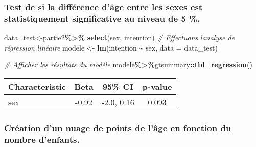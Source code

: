 \documentclass[
]{article}
\newenvironment{Shaded}{\begin{snugshade}}{\end{snugshade}}
\newcommand{\AttributeTok}[1]{\textcolor[rgb]{0.13,0.29,0.53}{#1}}
\newcommand{\CommentTok}[1]{\textcolor[rgb]{0.56,0.35,0.01}{\textit{#1}}}
\newcommand{\FunctionTok}[1]{\textcolor[rgb]{0.13,0.29,0.53}{\textbf{#1}}}
\newcommand{\NormalTok}[1]{#1}
\newcommand{\OtherTok}[1]{\textcolor[rgb]{0.56,0.35,0.01}{#1}}
\newcommand{\SpecialCharTok}[1]{\textcolor[rgb]{0.81,0.36,0.00}{\textbf{#1}}}
\begin{document}
\hypertarget{test-de-si-la-diffuxe9rence-duxe2ge-entre-les-sexes-est-statistiquement-significative-au-niveau-de-5-.}{%
\subsubsection{Test de si la différence d'âge entre les sexes est
statistiquement significative au niveau de 5
\%.}\label{test-de-si-la-diffuxe9rence-duxe2ge-entre-les-sexes-est-statistiquement-significative-au-niveau-de-5-.}}

\begin{Shaded}
\begin{Highlighting}[]
\NormalTok{data\_test}\OtherTok{\textless{}{-}}\NormalTok{partie2}\SpecialCharTok{\%\textgreater{}\%} \FunctionTok{select}\NormalTok{(sex, intention)}
\CommentTok{\# Effectuons l\textquotesingle{}analyse de régression linéaire}
\NormalTok{modele }\OtherTok{\textless{}{-}} \FunctionTok{lm}\NormalTok{(intention }\SpecialCharTok{\textasciitilde{}}\NormalTok{ sex, }\AttributeTok{data =}\NormalTok{ data\_test)}

\CommentTok{\# Afficher les résultats du modèle}
\NormalTok{modele}\SpecialCharTok{\%\textgreater{}\%}\NormalTok{gtsummary}\SpecialCharTok{::}\FunctionTok{tbl\_regression}\NormalTok{()}
\end{Highlighting}
\end{Shaded}

\begin{longtable}[]{@{}lccc@{}}
\toprule\noalign{}
\textbf{Characteristic} & \textbf{Beta} & \textbf{95\% CI} &
\textbf{p-value} \\
\midrule\noalign{}
\endhead
\bottomrule\noalign{}
\endlastfoot
sex & -0.92 & -2.0, 0.16 & 0.093 \\
\end{longtable}

\hypertarget{cruxe9ation-dun-nuage-de-points-de-luxe2ge-en-fonction-du-nombre-denfants.}{%
\subsubsection{Création d'un nuage de points de l'âge en fonction du
nombre
d'enfants.}\label{cruxe9ation-dun-nuage-de-points-de-luxe2ge-en-fonction-du-nombre-denfants.}}
\end{document}

